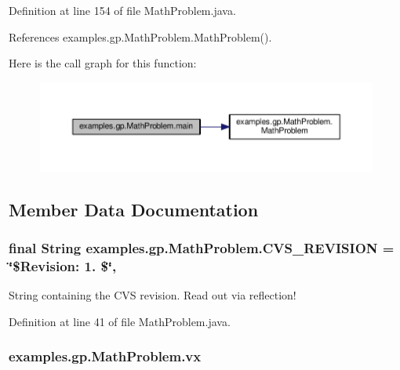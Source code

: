 Definition at line 154 of file Math\-Problem.\-java.



References examples.\-gp.\-Math\-Problem.\-Math\-Problem().



Here is the call graph for this function\-:
\nopagebreak
\begin{figure}[H]
\begin{center}
\leavevmode
\includegraphics[width=350pt]{classexamples_1_1gp_1_1_math_problem_a2f9e11286dec9014d514b4884f9453b1_cgraph}
\end{center}
\end{figure}




\subsection{Member Data Documentation}
\hypertarget{classexamples_1_1gp_1_1_math_problem_adf8e473d74650bddfad27593c814df45}{
\subsubsection[{C\-V\-S\-\_\-\-R\-E\-V\-I\-S\-I\-O\-N}]{\setlength{\rightskip}{0pt plus 5cm}final String examples.\-gp.\-Math\-Problem.\-C\-V\-S\-\_\-\-R\-E\-V\-I\-S\-I\-O\-N = \char`\"{}\$Revision\-: 1. \$\char`\"{}\hspace{0.3cm}{\ttfamily [static]}, {\ttfamily [private]}}}\label{classexamples_1_1gp_1_1_math_problem_adf8e473d74650bddfad27593c814df45}
String containing the C\-V\-S revision. Read out via reflection! 

Definition at line 41 of file Math\-Problem.\-java.

\hypertarget{classexamples_1_1gp_1_1_math_problem_a40167a51e121e6eca8a6dacb65646ff3}{
\subsubsection[{vx}]{ examples.\-gp.\-Math\-Problem.\-vx\hspace{0.3cm}{\ttfamily [static]}}}\label{classexamples_1_1gp_1_1_math_problem_a40167a51e121e6eca8a6dacb65646ff3}


